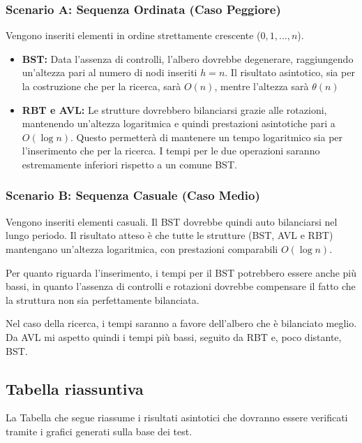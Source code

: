\documentclass{article}
\begin{document}
\subsubsection*{Scenario A: Sequenza Ordinata (Caso Peggiore)}
Vengono inseriti elementi in ordine strettamente crescente ($0, 1, ... , n$).
\begin{itemize}
    \item \textbf{BST:} Data l'assenza di controlli, l'albero dovrebbe degenerare, raggiungendo un'altezza pari al numero di nodi inseriti $h=n$. Il risultato asintotico, sia per la costruzione che per la ricerca, sarà $O(n)$, mentre l'altezza sarà $\theta(n)$
    \item \textbf{RBT e AVL:} Le strutture dovrebbero bilanciarsi grazie alle rotazioni, mantenendo un'altezza logaritmica e quindi prestazioni asintotiche pari a $O(\log n)$. Questo permetterà di mantenere un tempo logaritmico sia per l'inserimento che per la ricerca.
    I tempi per le due operazioni saranno estremamente inferiori rispetto a un comune BST.
\end{itemize}

\subsubsection*{Scenario B: Sequenza Casuale (Caso Medio)}
Vengono inseriti elementi casuali. Il BST dovrebbe quindi auto bilanciarsi nel lungo periodo. Il risultato atteso è che tutte le strutture (BST, AVL e RBT) mantengano un'altezza logaritmica, con prestazioni comparabili $O(\log n)$.

Per quanto riguarda l'inserimento, i tempi per il BST potrebbero essere anche più bassi, in quanto l'assenza di controlli e rotazioni dovrebbe compensare il fatto che la struttura non sia perfettamente bilanciata.

Nel caso della ricerca, i tempi saranno a favore dell'albero che è bilanciato meglio. Da AVL mi aspetto quindi i tempi più bassi, seguito da RBT e, poco distante, BST.

\clearpage
\subsection{Tabella riassuntiva}
La Tabella che segue riassume i risultati asintotici che dovranno essere verificati tramite i grafici generati sulla base dei test.
\end{document}
